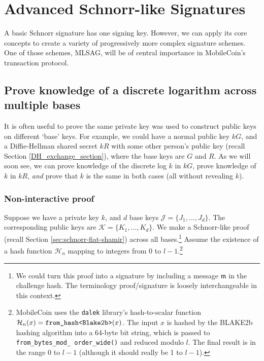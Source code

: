\chapter{Advanced Schnorr-like Signatures}
\label{chapter:advanced-schnorr}

A basic Schnorr signature has one signing key. However, we can apply its core concepts to create a variety of progressively more complex signature schemes. One of those schemes, MLSAG, will be of central importance in MobileCoin's transaction protocol.



\section{Prove knowledge of a discrete logarithm across multiple bases}
\label{sec:proofs-discrete-logarithm-multiple-bases}

It is often useful to prove the same private key was used to construct public keys on different `base' keys. For example, we could have a normal public key $k G$, and a Diffie-Hellman shared secret $k R$ with some other person's public key (recall Section \ref{DH_exchange_section}), where the base keys are $G$ and $R$. As we will soon see, we can prove knowledge of the discrete log $k$ in $k G$, prove knowledge of $k$ in $k R$, {\em and} prove that $k$ is the same in both cases (all without revealing $k$).


\subsection*{Non-interactive proof}

Suppose we have a private key $k$, and $d$ base keys $\mathcal{J} = \{J_1,...,J_d\}$. The corresponding public keys are $\mathcal{K} = \{K_1,...,K_d\}$. We make a Schnorr-like proof (recall Section \ref{sec:schnorr-fiat-shamir}) across all bases.\footnote{We could turn this proof into a signature by including a message $\mathfrak{m}$ in the challenge hash. The terminology proof/signature is loosely interchangeable in this context.} Assume the existence of a hash function \(\mathcal{H}_n\) 
mapping to integers from 0 to $l-1$.\footnote{MobileCoin uses the {\tt dalek} library's hash-to-scalar function $\mathcal{H}_n(x) = \textrm{\tt from\_hash<Blake2b>}(x)$. The input $x$ is hashed by the BLAKE2b hashing algorithm \cite{blake2-paper} into a 64-byte bit string, which is passed to {\tt from\_bytes\_mod\_ order\_wide()} and reduced modulo $l$. The final result is in the range 0 to $l-1$ (although it should really be 1 to $l-1$).}

